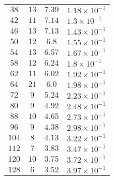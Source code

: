 \documentclass[]{article}
\begin{document}
\begin{table}
\begin{tabular}{|c | c | c | l |}
			$38$ & $13$ & $7.39$ & $1.18\times 10^{-1}$ \\ 
			$42$ & $11$ & $7.14$ & $1.3\times 10^{-1}$ \\ 
			$46$ & $13$ & $7.13$ & $1.43\times 10^{-1}$ \\ 
			$50$ & $12$ & $6.8$ & $1.55\times 10^{-1}$ \\ 
			$54$ & $13$ & $6.57$ & $1.67\times 10^{-1}$ \\ 
			$58$ & $12$ & $6.24$ & $1.8\times 10^{-1}$ \\ 
			$62$ & $11$ & $6.02$ & $1.92\times 10^{-1}$ \\ 
			$64$ & $21$ & $6.0$ & $1.98\times 10^{-1}$ \\ 
			$72$ & $9$ & $5.24$ & $2.23\times 10^{-1}$ \\ 
			$80$ & $9$ & $4.92$ & $2.48\times 10^{-1}$ \\ 
			$88$ & $10$ & $4.65$ & $2.73\times 10^{-1}$ \\ 
			$96$ & $9$ & $4.38$ & $2.98\times 10^{-1}$ \\ 
			$104$ & $8$ & $4.13$ & $3.22\times 10^{-1}$ \\ 
			$112$ & $7$ & $3.83$ & $3.47\times 10^{-1}$ \\ 
			$120$ & $10$ & $3.75$ & $3.72\times 10^{-1}$ \\ 
			$128$ & $6$ & $3.52$ & $3.97\times 10^{-1}$ \\  
			\hline  
		\end{tabular}
	\end{table}
	\vspace*{0.5 cm}
\end{document}

